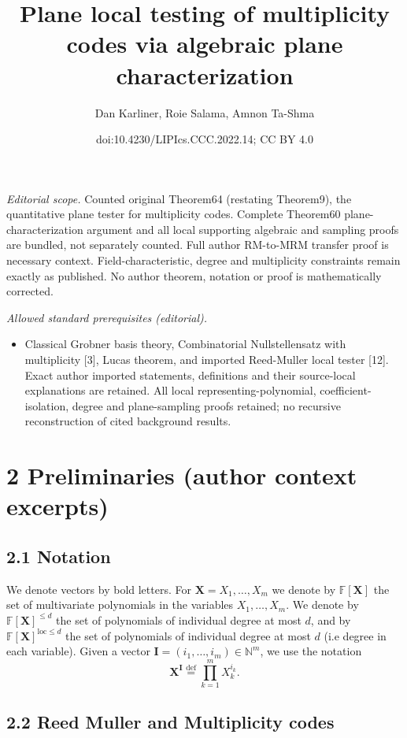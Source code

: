 \documentclass[10pt,a4paper]{article}
\title{Plane local testing of multiplicity codes via algebraic plane characterization}
\author{Dan Karliner, Roie Salama, Amnon Ta-Shma}
\date{doi:10.4230/LIPIcs.CCC.2022.14; CC BY 4.0}
\begin{document}
\maketitle
\noindent\textit{Editorial scope.} Counted original Theorem64 (restating Theorem9), the quantitative plane tester for multiplicity codes. Complete Theorem60 plane-characterization argument and all local supporting algebraic and sampling proofs are bundled, not separately counted. Full author RM-to-MRM transfer proof is necessary context. Field-characteristic, degree and multiplicity constraints remain exactly as published. No author theorem, notation or proof is mathematically corrected.\par\medskip
\noindent\textit{Allowed standard prerequisites (editorial).}\begin{itemize}
\item Classical Grobner basis theory, Combinatorial Nullstellensatz with multiplicity [3], Lucas theorem, and imported Reed-Muller local tester [12]. Exact author imported statements, definitions and their source-local explanations are retained. All local representing-polynomial, coefficient-isolation, degree and plane-sampling proofs retained; no recursive reconstruction of cited background results.
\end{itemize}\medskip
\section*{2 Preliminaries (author context excerpts)}
\subsection*{2.1 Notation}
We denote vectors by bold letters. For $\boldsymbol X=X_1,\ldots,X_m$ we denote by $\mathbb F[\boldsymbol X]$ the set of multivariate polynomials in the variables $X_1,\ldots,X_m$. We denote by $\mathbb F[\boldsymbol X]^{\leq d}$ the set of polynomials of individual degree at most $d$, and by $\mathbb F[\boldsymbol X]^{\mathrm{loc}\leq d}$ the set of polynomials of individual degree at most $d$ (i.e degree in each variable). Given a vector $\boldsymbol I=(i_1,\ldots,i_m)\in\mathbb N^m$, we use the notation
\[\boldsymbol X^{\boldsymbol I}\stackrel{\mathrm{def}}=\prod_{k=1}^mX_k^{i_k}.\]
\subsection*{2.2 Reed Muller and Multiplicity codes}
\end{document}
